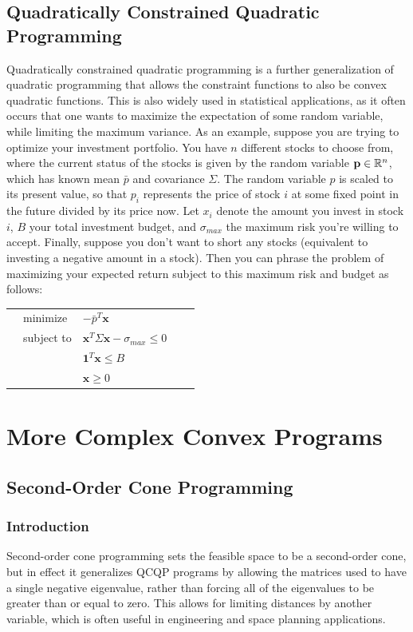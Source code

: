 \documentclass[10pt]{article}
\renewcommand{\vec}[1]{\mathbf{#1}}
\newcommand{\R}[1][]{ \ifx&#1& \mathbb{R} \else \mathbb{R}^{#1} \fi }
\newcommand{\x}{\vec{x}}
\begin{document}
\subsection{Quadratically Constrained Quadratic Programming}
Quadratically constrained quadratic programming is a further generalization of quadratic programming that allows the constraint functions to also be convex quadratic functions.\cite{boyd} This is also widely used in statistical applications, as it often occurs that one wants to maximize the expectation of some random variable, while limiting the maximum variance. As an example, suppose you are trying to optimize your investment portfolio. You have $n$ different stocks to choose from, where the current status of the stocks is given by the random variable $\vec{p}\in\R[n]$, which has known mean $\bar{p}$ and covariance $\Sigma$. The random variable $p$ is scaled to its present value, so that $p_i$ represents the price of stock $i$ at some fixed point in the future divided by its price now. Let $x_i$ denote the amount you invest in stock $i$, $B$ your total investment budget, and $\sigma_{max}$ the maximum risk you're willing to accept. Finally, suppose you don't want to short any stocks (equivalent to investing a negative amount in a stock). Then you can phrase the problem of maximizing your expected return subject to this maximum risk and budget as follows\cite{boyd}:
\begin{tabularx}{\textwidth}{X l l l X}
	& minimize		& $-\bar{p}^T\x$ & & \\
	& subject to	& $\x^T\Sigma\x-\sigma_{max}\leq 0$ & &\\
	& 				& $\vec{1}^T\x\leq B$ & & \\
	&				& $\vec{x}\geq 0$ & &
\end{tabularx}
\section{More Complex Convex Programs}
\subsection{Second-Order Cone Programming}
\subsubsection{Introduction}
Second-order cone programming sets the feasible space to be a second-order cone, but in effect it generalizes QCQP programs by allowing the matrices used to have a single negative eigenvalue, rather than forcing all of the eigenvalues to be greater than or equal to zero. This allows for limiting distances by another variable, which is often useful in engineering and space planning applications.
\end{document}

